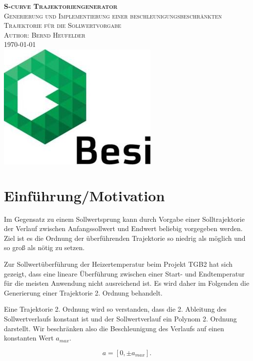 \documentclass[a4paper, 10pt]{scrartcl}
\begin{document}
	\begin{titlepage}
		\center 		
		\textsc{\huge \bfseries S-curve Trajektoriengenerator}\\[1cm] 
		\textsc{\Large Generierung und Implementierung einer beschleunigungsbeschränkten Trajektorie für die Sollwertvorgabe}\\[0.5cm] 
		\textsc{\large Author: Bernd Heufelder}\\[0.5cm] 
		{\large \today}\\[1cm] 
		\includegraphics[width=0.3\linewidth]{./pics/BesiLogo.jpg}\\[1cm]
		\begin{flushleft}
			\tableofcontents
		\end{flushleft}
	\end{titlepage}

	\section{Einführung/Motivation}
		Im Gegensatz zu einem Sollwertsprung kann durch Vorgabe einer Solltrajektorie der Verlauf zwischen Anfangssollwert und Endwert beliebig vorgegeben werden. Ziel ist es die Ordnung der überführenden Trajektorie so niedrig als möglich und so groß als nötig zu setzen. 
		
		Zur Sollwertüberführung der Heizertemperatur beim Projekt TGB2 hat sich gezeigt, dass eine lineare Überführung zwischen einer Start- und Endtemperatur für die meisten Anwendung nicht ausreichend ist. Es wird daher im Folgenden die Generierung einer Trajektorie 2. Ordnung behandelt. 
		
		Eine Trajektorie 2. Ordnung wird so verstanden, dass die 2. Ableitung des Sollwertverlaufs konstant ist und der Sollwertverlauf ein Polynom 2. Ordnung darstellt. Wir beschränken also die Beschleunigung des Verlaufs auf einen konstanten Wert $ a_{max} $.
		
		\begin{equation}
			a = [0, \pm a_{max}].
			\label{amax}
		\end{equation}
		
\end{document}
